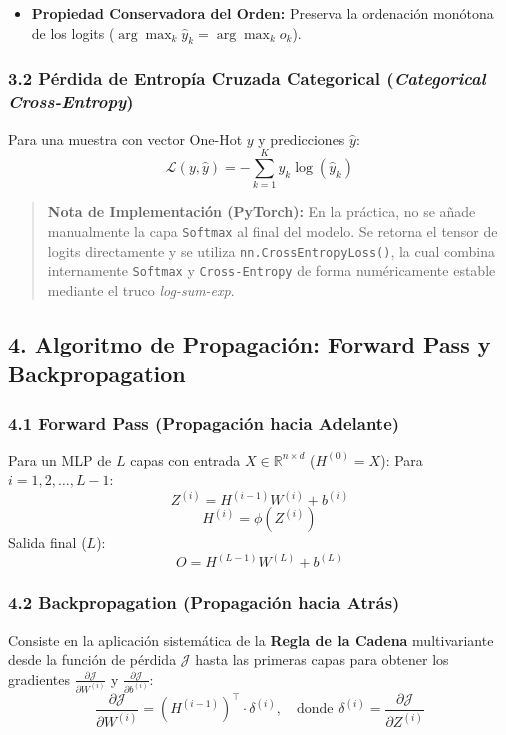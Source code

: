 \begin{itemize}
	\item \textbf{Propiedad Conservadora del Orden:} Preserva la ordenación monótona de los logits ($\arg\max_k \hat{y}_k = \arg\max_k o_k$).
\end{itemize}

\subsubsection{3.2 Pérdida de Entropía Cruzada Categorical (\emph{Categorical Cross-Entropy})}

Para una muestra con vector One-Hot $y$ y predicciones $\hat{y}$:
$$\mathcal{L}(y, \hat{y}) = - \sum_{k=1}^{K} y_k \log(\hat{y}_k)$$

\begin{quote}
	\textbf{Nota de Implementación (PyTorch):} En la práctica, no se añade manualmente la capa \texttt{Softmax} al final del modelo. Se retorna el tensor de logits directamente y se utiliza \texttt{nn.CrossEntropyLoss()}, la cual combina internamente \texttt{Softmax} y \texttt{Cross-Entropy} de forma numéricamente estable mediante el truco \emph{log-sum-exp}.
\end{quote}

\subsection{4. Algoritmo de Propagación: Forward Pass y Backpropagation}

\subsubsection{4.1 Forward Pass (Propagación hacia Adelante)}

Para un MLP de $L$ capas con entrada $X \in \mathbb{R}^{n \times d}$ ($H^{(0)} = X$):
Para $i = 1, 2, \dots, L-1$:
$$Z^{(i)} = H^{(i-1)} W^{(i)} + b^{(i)}$$
$$H^{(i)} = \phi(Z^{(i)})$$
Salida final ($L$):
$$O = H^{(L-1)} W^{(L)} + b^{(L)}$$

\subsubsection{4.2 Backpropagation (Propagación hacia Atrás)}

Consiste en la aplicación sistemática de la \textbf{Regla de la Cadena} multivariante desde la función de pérdida $\mathcal{J}$ hasta las primeras capas para obtener los gradientes $\frac{\partial \mathcal{J}}{\partial W^{(i)}}$ y $\frac{\partial \mathcal{J}}{\partial b^{(i)}}$:
$$\frac{\partial \mathcal{J}}{\partial W^{(i)}} = (H^{(i-1)})^\top \cdot \delta^{(i)}, \quad \text{donde } \delta^{(i)} = \frac{\partial \mathcal{J}}{\partial Z^{(i)}}$$

